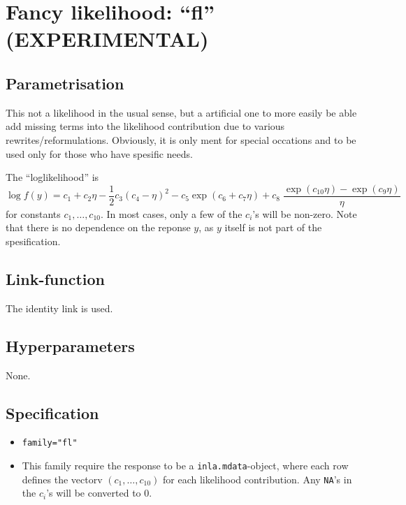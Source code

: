 \documentclass[a4paper,11pt]{article}
\begin{document}
\section*{Fancy likelihood: ``fl'' (EXPERIMENTAL)}

\subsection*{Parametrisation}

This not a likelihood in the usual sense, but a artificial one to more
easily be able add missing terms into the likelihood contribution due
to various rewrites/reformulations. Obviously, it is only ment for
special occations and to be used only for those who have spesific
needs.

The ``loglikelihood'' is
\begin{displaymath}
    \log f(y) = c_1 + c_2 \eta -\frac{1}{2} c_3 (c_4 - \eta)^{2} -
    c_5 \exp(c_6 + c_7 \eta) + c_8\;\frac{\exp(c_{10} \eta)-\exp(c_9\eta)}{\eta}
\end{displaymath}
for constants $c_1, \ldots, c_{10}$. In most cases, only a few of the
$c_i$'s will be non-zero. Note that there is no dependence on the
reponse $y$, as $y$ itself is not part of the spesification.

\subsection*{Link-function}

The identity link is used.

\subsection*{Hyperparameters}

None.

\subsection*{Specification}

\begin{itemize}
\item \texttt{family="fl"}
\item This family require the response to be a
    \texttt{inla.mdata}-object, where each row defines the vectorv
    $(c_1, \ldots, c_{10})$ for each likelihood contribution. Any
    \texttt{NA}'s in the $c_i$'s will be converted to 0.
\end{itemize}
\end{document}
